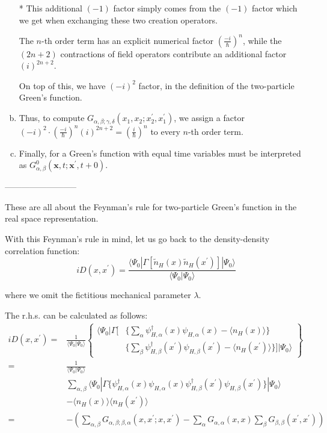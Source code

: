 \begin{enumerate}[(a)]
* This additional $(-1)$ factor simply comes from the $(-1)$ factor which we get when exchanging these two creation operators.

The $n$-th order term has an explicit numerical factor $\left( \frac{-i}{\hbar} \right)^n$, while the $(2n+2)$ contractions of field operators contribute an additional factor $(i)^{2n+2}$.

On top of this, we have $(-i)^2$ factor, in the definition of the two-particle Green's function.
\item Thus, to compute $G_{\alpha,\beta;\gamma,\delta}(x_1,x_2;x_2^{'},x_1^{'})$, we assign a factor $(-i)^2\cdot\left( \frac{-i}{\hbar} \right)^n(i)^{2n+2} = \left( \frac{i}{\hbar} \right)^n$ to every $n$-th order term.

\item Finally, for a Green's function with equal time variables must be interpreted as $G_{\alpha,\beta}^0 (\mathbf{x},t;\mathbf{x}^{'},t+0)$.
\end{enumerate}

\begin{center}--------------------------\end{center}

These are all about the Feynman's rule for two-particle Green's function in the real space representation.

With this Feynman's rule in mind, let us go back to the density-density correlation function:
\[i D(x,x^{'}) = \frac{\langle \Psi_0|\Gamma[\tilde{n}_H(x)\tilde{n}_H(x^{'})]|\Psi_0\rangle} {\langle \Psi_0|\Psi_0 \rangle}\]

where we omit the fictitious mechanical parameter $\lambda$.

The r.h.s. can be calculated as follows:
\[ \begin{split} i D(x,x^{'})
=&\frac{1}{\langle \Psi_0 | \Psi_0 \rangle}\left\{
\begin{split} \langle \Psi_0|\Gamma[&\{\sum_\alpha \psi_{H,\alpha}^\dagger(x)\psi_{H,\alpha}(x)-\langle n_H (x) \rangle\}\\
&\{\sum_\beta \psi_{H,\beta}^\dagger(x^{'}) \psi_{H,\beta}(x^{'})-\langle n_H (x^{'}) \rangle\}]|\Psi_0 \rangle
 \end{split} \right\}\\
=&\frac{1}{\langle \Psi_0 | \Psi_0 \rangle}\\
&\sum_{\alpha,\beta} \langle \Psi_0 | \Gamma\{\psi_{H,\alpha}^\dagger(x)\psi_{H,\alpha}(x)\psi_{H,\beta}^\dagger(x^{'})\psi_{H,\beta}(x^{'})\}|\Psi_0 \rangle\\
&-\langle n_H(x) \rangle \langle n_H(x^{'}) \rangle\\
=& - \left( \sum_{\alpha,\beta} G_{\alpha,\beta;\beta,\alpha}(x,x^{'};x,x^{'}) - \sum_{\alpha} G_{\alpha,\alpha}(x,x) \sum_{\beta}G_{\beta,\beta}(x^{'},x^{'}) \right)
 \end{split}\]

